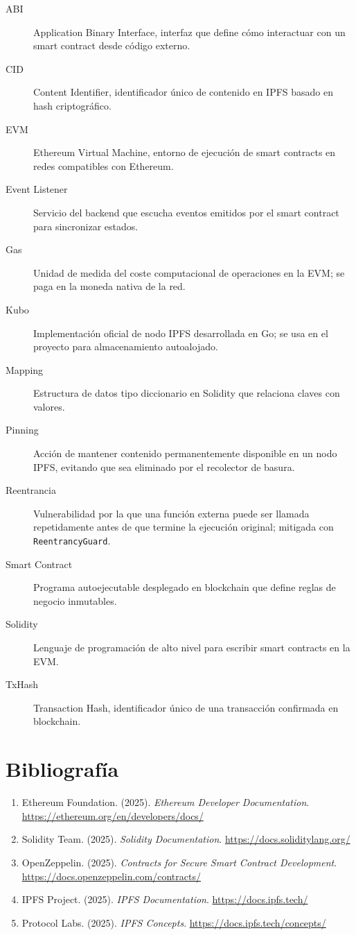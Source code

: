 \documentclass[11pt, a4paper]{article}
\begin{document}
\begin{description}
    \item[ABI] Application Binary Interface, interfaz que define c\'omo interactuar con un smart contract desde c\'odigo externo.
    \item[CID] Content Identifier, identificador \'unico de contenido en IPFS basado en hash criptogr\'afico.
    \item[EVM] Ethereum Virtual Machine, entorno de ejecuci\'on de smart contracts en redes compatibles con Ethereum.
    \item[Event Listener] Servicio del backend que escucha eventos emitidos por el smart contract para sincronizar estados.
    \item[Gas] Unidad de medida del coste computacional de operaciones en la EVM; se paga en la moneda nativa de la red.
    \item[Kubo] Implementaci\'on oficial de nodo IPFS desarrollada en Go; se usa en el proyecto para almacenamiento autoalojado.
    \item[Mapping] Estructura de datos tipo diccionario en Solidity que relaciona claves con valores.
    \item[Pinning] Acci\'on de mantener contenido permanentemente disponible en un nodo IPFS, evitando que sea eliminado por el recolector de basura.
    \item[Reentrancia] Vulnerabilidad por la que una funci\'on externa puede ser llamada repetidamente antes de que termine la ejecuci\'on original; mitigada con \texttt{ReentrancyGuard}.
    \item[Smart Contract] Programa autoejecutable desplegado en blockchain que define reglas de negocio inmutables.
    \item[Solidity] Lenguaje de programaci\'on de alto nivel para escribir smart contracts en la EVM.
    \item[TxHash] Transaction Hash, identificador \'unico de una transacci\'on confirmada en blockchain.
\end{description}

\section*{Bibliografía}

\begin{enumerate}
    \item Ethereum Foundation. (2025). \textit{Ethereum Developer Documentation}. \url{https://ethereum.org/en/developers/docs/}
    \item Solidity Team. (2025). \textit{Solidity Documentation}. \url{https://docs.soliditylang.org/}
    \item OpenZeppelin. (2025). \textit{Contracts for Secure Smart Contract Development}. \url{https://docs.openzeppelin.com/contracts/}
    \item IPFS Project. (2025). \textit{IPFS Documentation}. \url{https://docs.ipfs.tech/}
    \item Protocol Labs. (2025). \textit{IPFS Concepts}. \url{https://docs.ipfs.tech/concepts/}
\end{enumerate}
\end{document}
